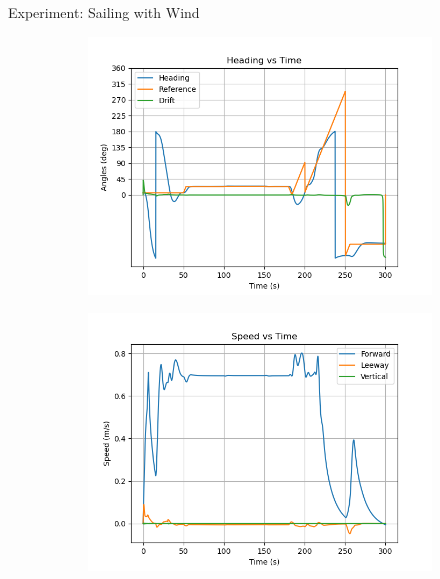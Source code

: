 \documentclass[10pt,xcolor={table,dvipsnames},t]{beamer}
\begin{document}
\begin{frame}{Experiment: Sailing with Wind}
    \begin{figure}
     \centering
     \begin{subfigure}[b]{0.4\textwidth}
         \centering
         \includegraphics[width=\textwidth,trim={0.5cm 0.25cm 1.25cm 0.75cm },clip]{documents/final_pres_figs/with_wind_to_40_40_heading.png}
         \label{fig:with_wind_heading}
     \end{subfigure}
     \begin{subfigure}[b]{0.4\textwidth}
         \centering
         \includegraphics[width=\textwidth,trim={0.5cm 0.25cm 1.25cm 0.75cm },clip]{documents/final_pres_figs/with_wind_to_40_40_speed.png}

\end{subfigure}
\end{figure}
\end{frame}
\end{document}
